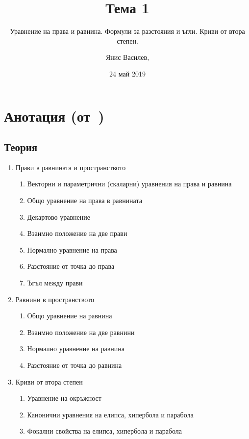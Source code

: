\documentclass[numbers=endperiod, DIV=15]{scrartcl}
\title{Тема 1}
\subtitle{Уравнение на права и равнина. Формули за разстояния и ъгли. Криви от втора степен.}
\author{Янис Василев, \Email{ianis@ivasilev.net}}
\date{24 май 2019}
\begin{document}
\maketitle

\section{Анотация (от~\cite{Syllabus})}

\subsection{Теория}

\begin{enumerate}
  \item Прави в равнината и пространството
  \begin{enumerate}
    \item Векторни и параметрични (скаларни) уравнения на права и равнина
    \item Общо уравнение на права в равнината
    \item Декартово уравнение
    \item Взаимно положение на две прави
    \item Нормално уравнение на права
    \item Разстояние от точка до права
    \item Ъгъл между прави
  \end{enumerate}

  \item Равнини в пространството
  \begin{enumerate}
    \item Общо уравнение на равнина
    \item Взаимно положение на две равнини
    \item Нормално уравнение на равнина
    \item Разстояние от точка до равнина
  \end{enumerate}

  \item Криви от втора степен
  \begin{enumerate}
    \item Уравнение на окръжност
    \item Канонични уравнения на елипса, хипербола и парабола
    \item Фокални свойства на елипса, хипербола и парабола
  \end{enumerate}
\end{enumerate}
\end{document}
